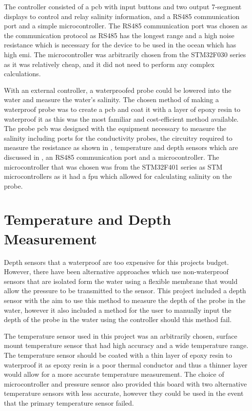 The controller consisted of a \gls{pcb} with input buttons and two output 7-segment displays to control and relay salinity information, and a RS485 communication port and a simple microcontroller.
The RS485 communication port was chosen as the communication protocol as RS485 has the longest range and a high noise resistance which is necessary for the device to be used in the ocean which has high \gls{emi}.
The microcontroller was arbitrarily chosen from the STM32F030 series as it was relatively cheap, and it did not need to perform any complex calculations.

With an external controller, a waterproofed probe could be lowered into the water and measure the water's salinity.
The chosen method of making a waterproof probe was to create a \gls{pcb} and coat it with a layer of epoxy resin to waterproof it as this was the most familiar and cost-efficient method available.
The probe \gls{pcb} was designed with the equipment necessary to measure the salinity including ports for the conductivity probes, the circuitry required to measure the resistance as shown in , temperature and depth sensors which are discussed in , an RS485 communication port and a microcontroller.
The microcontroller that was chosen was from the STM32F401 series as STM microcontrollers as it had a \gls{fpu} which allowed for calculating salinity on the probe. 

\section{Temperature and Depth Measurement}\label{sec:temp-depth-measurement}

Depth sensors that a waterproof are too expensive for this projects budget.
However, there have been alternative approaches which use non-waterproof sensors that are isolated form the water using a flexible membrane that would allow the pressure to be transmitted to the sensor.
This project included a depth sensor with the aim to use this method to measure the depth of the probe in the water, however it also included a method for the user to manually input the depth of the probe in the water using the controller should this method fail.

The temperature sensor used in this project was an arbitrarily chosen, surface mount temperature sensor that had high accuracy and a wide temperature range.
The temperature sensor should be coated with a thin layer of epoxy resin to waterproof it as epoxy resin is a poor thermal conductor and thus a thinner layer would allow for a more accurate temperature measurement.
The choice of microcontroller and pressure sensor also provided this board with two alternative temperature sensors with less accurate, however they could be used in the event that the primary temperature sensor failed.

